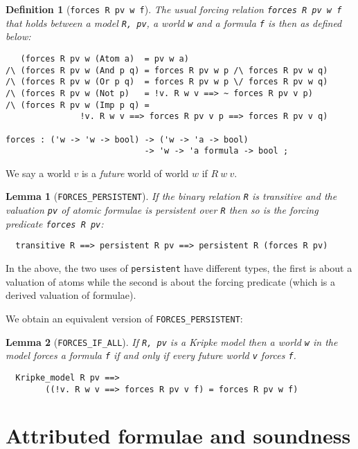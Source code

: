 \documentclass[a4paper]{article}
\newtheorem{lemma}{Lemma}
\newtheorem{definition}{Definition}
\begin{document}
\begin{definition}[\texttt{forces R pv w f}]\label{defn-forces}
  The usual forcing relation \texttt{forces R pv w f} that
  holds between a model \texttt{R, pv}, a world \texttt{w} and a
  formula \texttt{f} is then as defined below:
\begin{verbatim}
   (forces R pv w (Atom a)  = pv w a) 
/\ (forces R pv w (And p q) = forces R pv w p /\ forces R pv w q) 
/\ (forces R pv w (Or p q)  = forces R pv w p \/ forces R pv w q) 
/\ (forces R pv w (Not p)   = !v. R w v ==> ~ forces R pv v p) 
/\ (forces R pv w (Imp p q) =
               !v. R w v ==> forces R pv v p ==> forces R pv v q) 

forces : ('w -> 'w -> bool) -> ('w -> 'a -> bool) 
                            -> 'w -> 'a formula -> bool ;
\end{verbatim}
\end{definition}

We say a world $v$ is a \emph{future} world of world $w$ if $R\ w\ v$.

\begin{lemma}[\texttt{FORCES\_PERSISTENT}]
If the binary relation \texttt{R} is transitive and 
the valuation \texttt{pv} of atomic formulae is persistent over \texttt{R} 
then so is the forcing predicate \texttt{forces R pv}:
\begin{verbatim}
  transitive R ==> persistent R pv ==> persistent R (forces R pv)
\end{verbatim}
\end{lemma}

In the above, the two uses of \texttt{persistent} have
different types, the first is about a valuation of atoms while the
second is about the forcing predicate (which is a derived valuation of
formulae).

We obtain an equivalent version of 
\texttt{FORCES\_PERSISTENT}:
\begin{lemma}[\texttt{FORCES\_IF\_ALL}]
If \texttt{R, pv} is a Kripke model then
a world \texttt{w} in the model forces a formula \texttt{f}
if and only if every future world \texttt{v} forces \texttt{f}.
\begin{verbatim}
  Kripke_model R pv ==> 
        ((!v. R w v ==> forces R pv v f) = forces R pv w f)
\end{verbatim}
\end{lemma}

\section{Attributed formulae and soundness}
\end{document}
